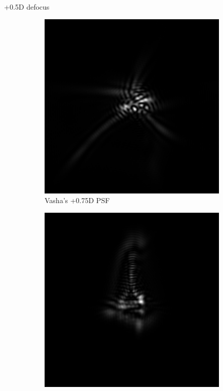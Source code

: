 \documentclass{article}
\begin{document}
+0.5D defocus
\begin{figure}[H]

\begin{subfigure}{.3\textwidth}
  \centering
  \includegraphics[width=1\linewidth]{Vasha_R_G_0530_2_500_zer_05_5_PSF.png}
  \caption{Vasha's +0.75D PSF}
  \label{fig:vasha05dpsf}
\end{subfigure}
\begin{subfigure}{.3\textwidth}
  \centering
  \includegraphics[width=1\linewidth]{Liz_R_G_0523_2_500_zer_05_5_PSF.png}

\end{subfigure}
\end{figure}
\end{document}
